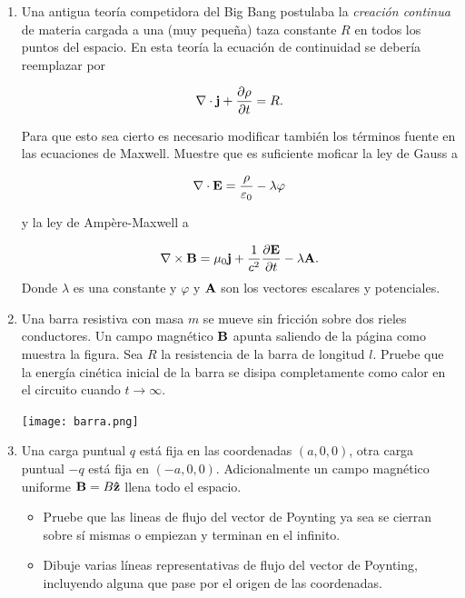 \documentclass[letterpaper,10pt,onecolumn]{article}
\begin{document}
\begin{enumerate}
\item Una antigua teor\'ia competidora del Big Bang postulaba la
  \emph{creaci\'on continua} de materia cargada a una (muy peque\~na) taza
  constante $R$ en  todos los puntos del espacio. En esta teor\'ia la
  ecuaci\'on de continuidad se deber\'ia reemplazar por

\begin{displaymath}
\nabla\cdot{\bf j} + \frac{\partial\rho}{\partial t} = R.
\end{displaymath}

Para que esto sea cierto es necesario modificar tambi\'en los
t\'erminos fuente en las ecuaciones de Maxwell. Muestre que es
suficiente moficar la ley de Gauss a

\begin{displaymath}
\nabla\cdot{\bf E} = \frac{\rho}{\varepsilon_0} - \lambda\varphi
\end{displaymath}

y la ley de Amp\`ere-Maxwell a

\begin{displaymath}
\nabla\times{\bf B} = \mu_0 {\bf j} + \frac{1}{c^2}\frac{\partial {\bf
E}}{\partial t} - \lambda{\bf A}.
\end{displaymath}
Donde $\lambda$ es una constante y $\varphi$ y ${\bf A}$ son los
vectores escalares y potenciales.


\item Una barra resistiva con masa $m$ se mueve sin fricci\'on sobre
  dos rieles conductores. Un campo magn\'etico ${\bf B}$ apunta
  saliendo de la p\'agina como muestra la figura. Sea $R$ la
  resistencia de la barra de longitud $l$. Pruebe que la energ\'ia
  cin\'etica inicial de la barra se disipa completamente como calor en
  el circuito cuando $t\rightarrow \infty$.
\begin{center}
\texttt{[image: barra.png]}
\end{center}

\item Una carga puntual $q$ est\'a fija en las coordenadas  $(a,0,0)$, otra
  carga puntual $-q$ est\'a fija en $(-a,0,0)$. Adicionalmente un
  campo magn\'etico uniforme ${\bf B}=B{\bf \hat{z}}$ llena todo el
  espacio.
\begin{itemize}
\item  Pruebe que las lineas de flujo del vector de Poynting ya sea se cierran
  sobre s\'i  mismas o empiezan y terminan en el infinito. 
\item Dibuje varias l\'ineas representativas de flujo del vector de
  Poynting,  incluyendo alguna que pase por el origen de las coordenadas.
\end{itemize}



\end{enumerate}
\end{document}
